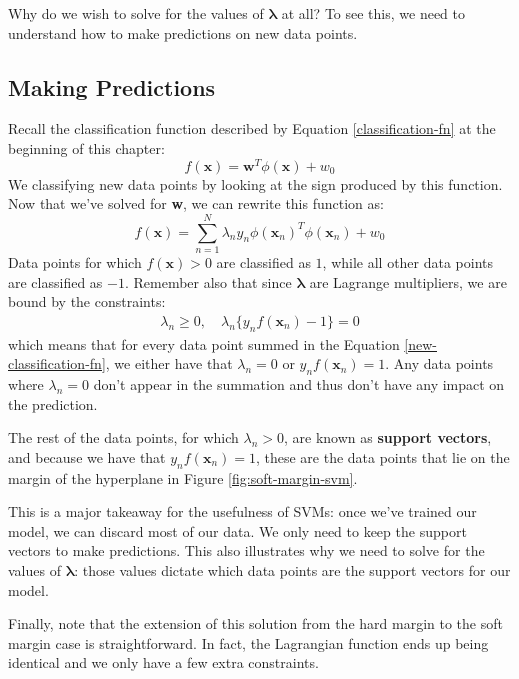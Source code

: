 Why do we wish to solve for the values of $\boldsymbol{\lambda}$ at all? To see this, we need to understand how to make predictions on new data points.

\subsection{Making Predictions}
Recall the classification function described by Equation \ref{classification-fn} at the beginning of this chapter:
\begin{equation*}
f(\textbf{x}) = \textbf{w}^{T}\phi(\textbf{x}) + w_{0}
\end{equation*}
We classifying new data points by looking at the sign produced by this function. Now that we've solved for \textbf{w}, we can rewrite this function as:
\begin{equation} \label{new-classification-fn}
	f(\textbf{x}) = \sum_{n=1}^{N} \lambda_{n} y_{n} \phi(\textbf{x}_{n})^{T} \phi(\textbf{x}_{n}) + w_{0}
\end{equation}
Data points for which $f(\textbf{x}) > 0$ are classified as $1$, while all other data points are classified as $-1$. Remember also that since $\boldsymbol{\lambda}$ are Lagrange multipliers, we are bound by the constraints:
\begin{align*}
	\lambda_{n} \geq 0, \quad \lambda_{n} \{y_{n} f(\textbf{x}_{n}) - 1\} = 0
\end{align*}
which means that for every data point summed in the Equation \ref{new-classification-fn}, we either have that $\lambda_{n} = 0$ or $y_{n} f(\textbf{x}_{n}) = 1$. Any data points where $\lambda_{n} = 0$ don't appear in the summation and thus don't have any impact on the prediction.

The rest of the data points, for which $\lambda_{n} > 0$, are known as \textbf{support vectors}, and because we have that $y_{n} f(\textbf{x}_{n}) = 1$, these are the data points that lie on the margin of the hyperplane in Figure \ref{fig:soft-margin-svm}.

This is a major takeaway for the usefulness of SVMs: once we've trained our model, we can discard most of our data. We only need to keep the support vectors to make predictions. This also illustrates why we need to solve for the values of $\boldsymbol{\lambda}$: those values dictate which data points are the support vectors for our model.

Finally, note that the extension of this solution from the hard margin to the soft margin case is straightforward. In fact, the Lagrangian function ends up being identical and we only have a few extra constraints.


